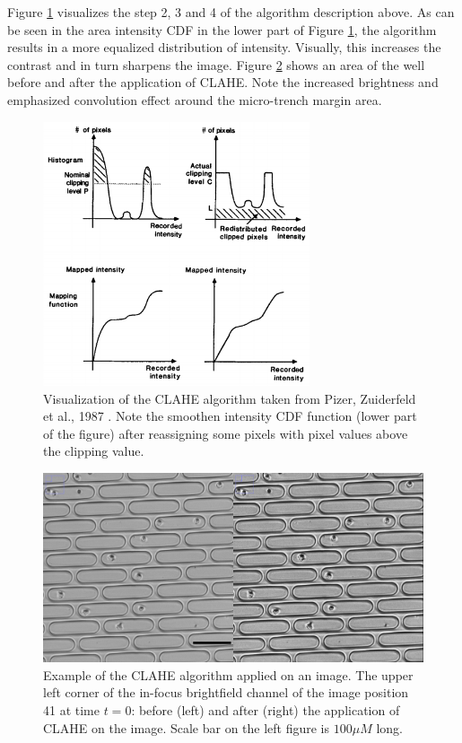 \documentclass[pdftex,12pt,a4paper]{report}
\begin{document}
Figure \ref{fig:clahe} visualizes the step 2, 3 and 4 of the algorithm description above. As can be seen in the area intensity CDF in the lower part of Figure \ref{fig:clahe}, the algorithm results in a more equalized distribution of intensity. Visually, this increases the contrast and in turn sharpens the image. Figure \ref{fig:clahe_before_after} shows an area of the well before and after the application of CLAHE. Note the increased brightness and emphasized convolution effect around the micro-trench margin area.

\begin{figure}[H]
\centering
\includegraphics[width=0.7\textwidth]{images/clahe}
\caption[Visualizatoin of the CLAHE algorithm]{Visualization of the CLAHE algorithm taken from Pizer, Zuiderfeld et al., 1987 \cite{pizer1987adaptive}. Note the  smoothen intensity CDF function (lower part of the figure) after reassigning some pixels with pixel values above the clipping value.}
\label{fig:clahe}
\end{figure}

\begin{figure}[H]
\centering
\includegraphics[width=\textwidth]{images/clahe_before_after}
\caption[Example of application of CLAHE algorithm]{Example of the CLAHE algorithm applied on an image. The upper left corner of the in-focus brightfield channel of the image position 41 at time $t=0$: before (left) and after (right) the application of CLAHE on the image. Scale bar on the left figure is $100 \mu M$ long.}
\label{fig:clahe_before_after}
\end{figure}
\end{document}
